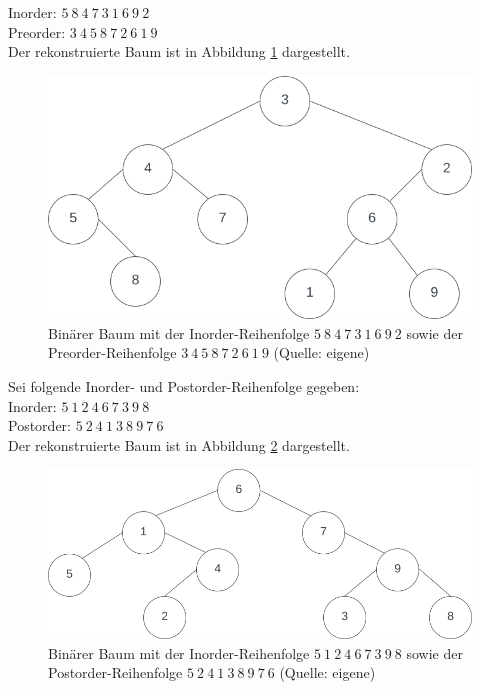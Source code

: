 \noindent
Inorder: $5\ 8\ 4\ 7\ 3\ 1\ 6\ 9\ 2$\\
Preorder: $3\ 4\ 5\ 8\ 7\ 2\ 6\ 1\ 9$\\

\noindent
Der rekonstruierte Baum ist in Abbildung \ref{fig:inpre} dargestellt.\\

\begin{figure}
    \begin{center}
        \includegraphics[scale=0.4]{chapters/Datenstrukturen und Algorithmen/img/inpre}
        \caption{Binärer Baum mit der Inorder-Reihenfolge $5\ 8\ 4\ 7\ 3\ 1\ 6\ 9\ 2$ sowie der Preorder-Reihenfolge $3\ 4\ 5\ 8\ 7\ 2\ 6\ 1\ 9$  (Quelle: eigene)}
        \label{fig:inpre}
    \end{center}
\end{figure}

\noindent
Sei folgende Inorder- und Postorder-Reihenfolge gegeben:\\

\noindent
Inorder: $5\ 1\ 2\ 4\ 6\ 7\ 3\ 9\ 8$\\
Postorder: $5\ 2\ 4\ 1\ 3\ 8\ 9\ 7\ 6$\\

\noindent
Der rekonstruierte Baum ist in Abbildung \ref{fig:inpost} dargestellt.


\begin{figure}
    \begin{center}
        \includegraphics[scale=0.4]{chapters/Datenstrukturen und Algorithmen/img/inpost}
        \caption{Binärer Baum mit der Inorder-Reihenfolge $5\ 1\ 2\ 4\ 6\ 7\ 3\ 9\ 8$ sowie der Postorder-Reihenfolge $5\ 2\ 4\ 1\ 3\ 8\ 9\ 7\ 6$  (Quelle: eigene)}
        \label{fig:inpost}
    \end{center}
\end{figure}


